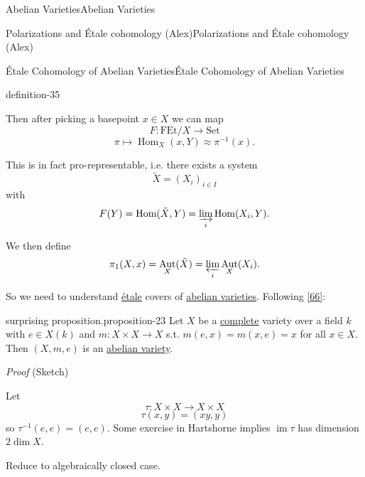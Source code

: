 \documentclass[10pt,]{book}
\makeatletter
\renewcommand*{\proofname}{Proof}
\renewenvironment{proof}[1][\proofname]{\par
  \pushQED{\qed}%
  \normalfont \topsep6\p@\@plus6\p@\relax
  \trivlist
  \item\relax
    {\itshape
    #1\@addpunct{.}}\hspace\labelsep\ignorespaces
}{%
  \popQED\endtrivlist\@endpefalse
}
\numberwithin{equation}{section}
\DeclareMathOperator{\Hom}{Hom}
\DeclareMathOperator{\im}{im}
\DeclareMathOperator{\Aut}{Aut}
\makeatother
\begin{document}
\begin{chapterptx}{Abelian Varieties}{}{Abelian Varieties}{}{}
\begin{sectionptx}{Polarizations and Étale cohomology (Alex)}{}{Polarizations and Étale cohomology (Alex)}{}{}
\begin{subsectionptx}{Étale Cohomology of Abelian Varieties}{}{Étale Cohomology of Abelian Varieties}{}{}
\begin{definition}{}{definition-35}
\par
\hypertarget{p-280}{}%
Then after picking a basepoint \(x\in X\) we can map%
\begin{equation*}
F\colon \mathrm{FEt}/X\to \mathrm{Set}
\end{equation*}
%
\begin{equation*}
\pi\mapsto \Hom_X(x,Y) \approx\pi^{-1}(x)\text{.}
\end{equation*}
%
\par
\hypertarget{p-281}{}%
This is in fact pro-representable, i.e. there exists a system%
\begin{equation*}
\tilde X = (X_i)_{i\in I}
\end{equation*}
with%
\begin{equation*}
F(Y) = \Hom(\tilde X ,Y) = \varinjlim_i \Hom(X_i, Y)\text{.}
\end{equation*}
%
\par
\hypertarget{p-282}{}%
We then define%
\begin{equation*}
\pi_1(X,x) = \Aut_X(\tilde X) = \varprojlim_i \Aut_X(X_i)\text{.}
\end{equation*}
%
\end{definition}
\hypertarget{p-283}{}%
So we need to understand \hyperref[def-etale]{étale} covers of \hyperref[def-buntes-abvar]{abelian varieties}. Following \hyperlink{bib-vandergeer-moonen}{[66]}:%
\begin{proposition}{surprising proposition.}{}{proposition-23}%
\hypertarget{p-284}{}%
Let \(X\)  be a \hyperref[def-abelian-complete-var]{complete} variety over a field \(k\) with \(e\in X(k)\) and \(m \colon X\times X\to X\) s.t. \(m(e,x) = m(x,e) = x\) for all \(x \in X\). Then \((X, m,e)\) is an \hyperref[def-buntes-abvar]{abelian variety}.%
\end{proposition}
\begin{proof}\hypertarget{proof-47}{}
\hypertarget{p-285}{}%
(Sketch)%
\par
\hypertarget{p-286}{}%
Let%
\begin{equation*}
\tau\colon X\times X \to X\times X
\end{equation*}
%
\begin{equation*}
\tau(x,y) = (xy,y)
\end{equation*}
so \(\tau^{-1} (e,e) = (e,e)\). Some exercise in Hartshorne implies \(\im \tau\) has dimension \(2\dim X\).%
\par
\hypertarget{p-287}{}%
Reduce to algebraically closed case.%
\par
\hypertarget{p-288}{}%

\end{proof}
\end{subsectionptx}
\end{sectionptx}
\end{chapterptx}
\end{document}
